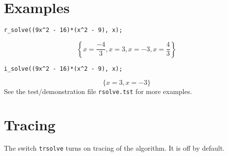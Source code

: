 \section{Examples}

\begin{verbatim}
r_solve((9x^2 - 16)*(x^2 - 9), x);
\end{verbatim}
\[
  \left\{x=\frac{-4}{3},x=3,x=-3,x=\frac{4}{3}\right\}
\]
\begin{verbatim}
i_solve((9x^2 - 16)*(x^2 - 9), x);
\end{verbatim}
\[
  \{x=3,x=-3\}
\]
See the test/demonstration file \verb|rsolve.tst| for more examples.


\section{Tracing}

The switch {\tt trsolve} turns on tracing of the algorithm.  It is off
by default.


